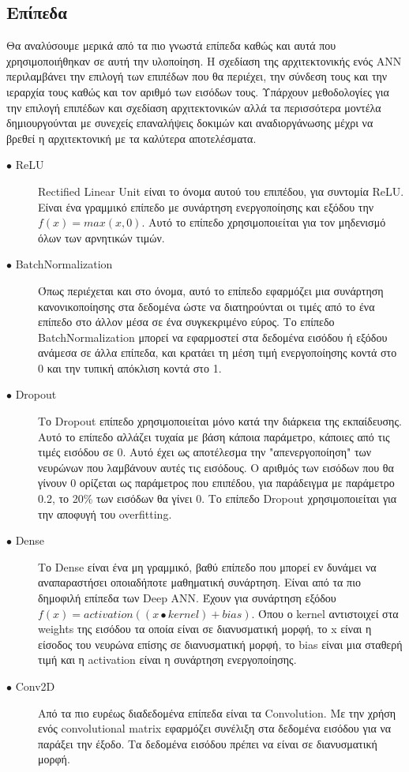 \subsection{Επίπεδα}
Θα αναλύσουμε μερικά από τα πιο γνωστά επίπεδα καθώς και αυτά που χρησιμοποιήθηκαν σε αυτή την υλοποίηση. Η σχεδίαση της αρχιτεκτονικής ενός ANN περιλαμβάνει την επιλογή των επιπέδων που θα περιέχει, την σύνδεση τους και την ιεραρχία τους καθώς και τον αριθμό των εισόδων τους. Υπάρχουν μεθοδολογίες για την επιλογή επιπέδων και σχεδίαση αρχιτεκτονικών αλλά τα περισσότερα μοντέλα δημιουργούνται με συνεχείς επαναλήψεις δοκιμών και αναδιοργάνωσης μέχρι να βρεθεί η αρχιτεκτονική με τα καλύτερα αποτελέσματα.

\begin{description}

\item[$\bullet$ ReLU] Rectified Linear Unit είναι το όνομα αυτού του επιπέδου, για συντομία ReLU. Είναι ένα γραμμικό επίπεδο με συνάρτηση ενεργοποίησης και εξόδου την $f(x) = max(x, 0)$. Αυτό το επίπεδο χρησιμοποιείται για τον μηδενισμό όλων των αρνητικών τιμών.

\item[$\bullet$ BatchNormalization] Όπως περιέχεται και στο όνομα, αυτό το επίπεδο εφαρμόζει μια συνάρτηση κανονικοποίησης στα δεδομένα ώστε να διατηρούνται οι τιμές από το ένα επίπεδο στο άλλον μέσα σε ένα συγκεκριμένο εύρος. Το επίπεδο BatchNormalization μπορεί να εφαρμοστεί στα δεδομένα εισόδου ή εξόδου ανάμεσα σε άλλα επίπεδα, και κρατάει τη μέση τιμή ενεργοποίησης κοντά στο 0 και την τυπική απόκλιση κοντά στο 1. \cite{batch}

\item[$\bullet$ Dropout ] Το Dropout επίπεδο χρησιμοποιείται μόνο κατά την διάρκεια της εκπαίδευσης. Αυτό το επίπεδο αλλάζει τυχαία με βάση κάποια παράμετρο, κάποιες από τις τιμές εισόδου σε 0. Αυτό έχει ως αποτέλεσμα την "απενεργοποίηση" των νευρώνων που λαμβάνουν αυτές τις εισόδους. Ο αριθμός των εισόδων που θα γίνουν 0 ορίζεται ως παράμετρος που επιπέδου, για παράδειγμα με παράμετρο 0.2, το 20\% των εισόδων θα γίνει 0. Το επίπεδο Dropout χρησιμοποιείται για την αποφυγή του overfitting. \cite{dropout}

\item[$\bullet$ Dense] Το Dense είναι ένα μη γραμμικό, βαθύ επίπεδο που μπορεί εν δυνάμει να αναπαραστήσει οποιαδήποτε μαθηματική συνάρτηση. Είναι από τα πιο δημοφιλή επίπεδα των Deep ANN. Έχουν για συνάρτηση εξόδου  $f(x) = activation((x \bullet kernel) + bias)$. Όπου ο kernel αντιστοιχεί στα weights της εισόδου τα οποία είναι σε διανυσματική μορφή, το x είναι η είσοδος του νευρώνα επίσης σε διανυσματική μορφή, το bias είναι μια σταθερή τιμή και η activation είναι η συνάρτηση ενεργοποίησης. \cite{dense}

\item[$\bullet$ Conv2D] Από τα πιο ευρέως διαδεδομένα επίπεδα είναι τα Convolution. Με την χρήση ενός convolutional matrix εφαρμόζει συνέλιξη στα δεδομένα εισόδου για να παράξει την έξοδο. Τα δεδομένα εισόδου πρέπει να είναι σε διανυσματική μορφή.

\end{description}



